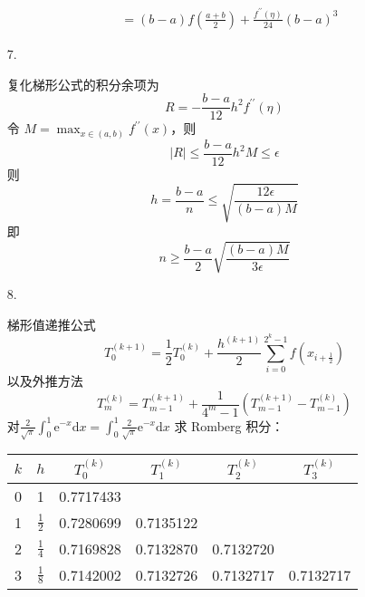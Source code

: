 \documentclass{sjtuarticle}
\def\dd{\mathrm{d}}
\def\ee{\mathrm{e}}
\begin{document}
\begin{itemize}
\begin{solution}
\begin{align*}
            &=(b-a)f\left(\frac{a+b}{2}\right)+\frac{f^{\prime\prime}(\eta)}{24}(b-a)^3
        \end{align*}
    \end{solution}
    \item[7.] \begin{solution}
        复化梯形公式的积分余项为
        \begin{equation*}
            R = -\frac{b-a}{12}h^2f^{\prime\prime}(\eta)
        \end{equation*}
        令 $M=\max_{x\in(a,b)}f^{\prime\prime}(x)$，则
        \begin{equation*}
            |R|\leq \frac{b-a}{12}h^2M \leq \epsilon
        \end{equation*}
        则
        \begin{equation*}
            h=\frac{b-a}{n} \leq \sqrt{\frac{12\epsilon}{(b-a)M}}
        \end{equation*}
        即
        \begin{equation*}
            n\geq \frac{b-a}{2}\sqrt{\frac{(b-a)M}{3\epsilon}}
        \end{equation*}
    \end{solution}
    \item[8.] \begin{solution}
        梯形值递推公式
        \begin{equation*}
            T_0^{(k+1)}=\frac{1}{2}T_0^{(k)}+\frac{h^{(k+1)}}{2}\sum_{i=0}^{2^{k}-1}f(x_{i+\frac{1}{2}})
        \end{equation*}
        以及外推方法
        \begin{equation*}
            T_m^{(k)}=T_{m-1}^{(k+1)}+\frac{1}{4^m-1}(T_{m-1}^{(k+1)}-T_{m-1}^{(k)})
        \end{equation*}
        对$\frac{2}{\sqrt{\pi}}\int_0^1 \ee^{-x}\dd x=\int_0^1 \frac{2}{\sqrt{\pi}}\ee^{-x}\dd x$ 求 Romberg 积分：
        \begin{center}
        \begin{tabular}{cccccc}
            \toprule
            $k$ & $h$ & $T_0^{(k)}$ & $T_1^{(k)}$ & $T_2^{(k)}$ &  $T_3^{(k)}$ \\
            \midrule
            0 & 1 & 0.7717433 \\
            1 & $\frac{1}{2}$ & 0.7280699	& 0.7135122 & 	\\
            2 & $\frac{1}{4}$ & 0.7169828	& 0.7132870	& 0.7132720	& \\
            3 & $\frac{1}{8}$ & 0.7142002	& 0.7132726 & 	0.7132717 &	0.7132717 \\

\end{tabular}
\end{center}
\end{solution}
\end{itemize}
\end{document}
